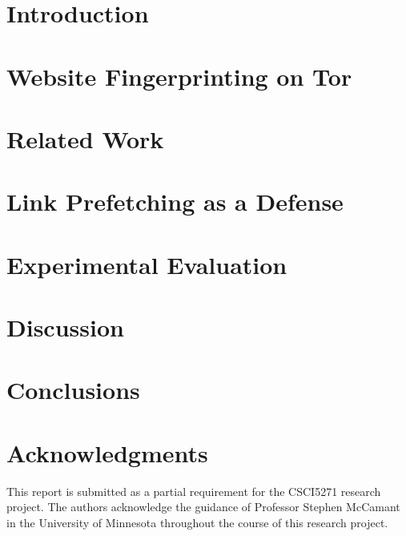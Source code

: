\documentclass{sig-alternate-05-2015}
\begin{document}

\section{Introduction}


\section{Website Fingerprinting on Tor}
\label{sec2}


\section{Related Work}
\label{sec3}


\section{Link Prefetching as a Defense}
\label{sec4}


\section{Experimental Evaluation}
\label{sec5}


\section{Discussion}
\label{sec6}


\section{Conclusions}
\label{sec7}



\section{Acknowledgments}
This report is submitted as a partial requirement for the CSCI5271 research project.
The authors acknowledge the guidance of Professor Stephen McCamant in the University of Minnesota throughout the course of this research project.



\end{document}
